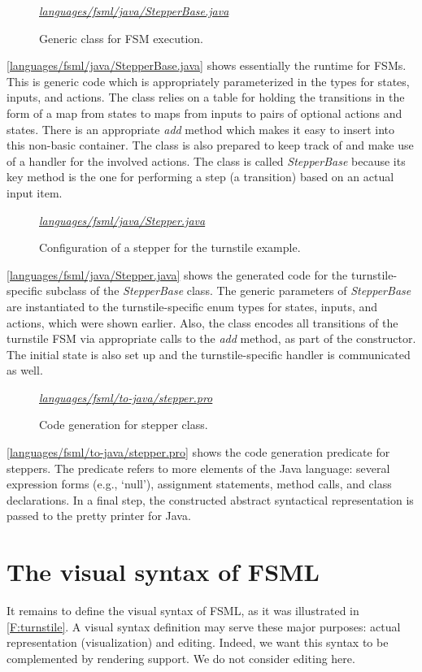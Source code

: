 \documentclass[preprint,authoryear,12pt]{noelsarticle}
\newcommand{\codefigure}[3]{
\begin{figure}[t!]
\begin{boxedminipage}{\hsize}
\mbox{}\hfill{}{\small\textit{\href{http://github.com/slebok/slepro/tree/master/#2}{#2}}}

\end{boxedminipage}
\caption{#1.}
\label{#2}
\medskip
\end{figure}}
\begin{document}
\codefigure{%
Generic class for FSM execution}{%
languages/fsml/java/StepperBase.java}{%
java}

\autoref{languages/fsml/java/StepperBase.java} shows essentially the
runtime for FSMs. This is generic code which is appropriately
parameterized in the types for states, inputs, and actions. The class
relies on a table for holding the transitions in the form of a map
from states to maps from inputs to pairs of optional actions and
states. There is an appropriate \emph{add} method which makes it easy
to insert into this non-basic container. The class is also prepared to
keep track of and make use of a handler for the involved actions. The
class is called \emph{StepperBase} because its key method is the one for
performing a step (a transition) based on an actual input item.

\codefigure{%
Configuration of a stepper for the turnstile example}{%
languages/fsml/java/Stepper.java}{%
java}

\autoref{languages/fsml/java/Stepper.java} shows the generated code
for the turnstile-specific subclass of the \emph{StepperBase}
class. The generic parameters of \emph{StepperBase} are instantiated
to the turnstile-specific enum types for states, inputs, and actions,
which were shown earlier. Also, the class encodes all transitions of
the turnstile FSM via appropriate calls to the \emph{add} method, as
part of the constructor. The initial state is also set up and the
turnstile-specific handler is communicated as well.

\codefigure{%
Code generation for stepper class}{%
languages/fsml/to-java/stepper.pro}{%
prolog}

\autoref{languages/fsml/to-java/stepper.pro} shows the code generation
predicate for steppers. The predicate refers to more elements of the
Java language: several expression forms (e.g., `null'), assignment
statements, method calls, and class declarations. In a final step, the
constructed abstract syntactical representation is passed to the
pretty printer for Java.


\section{The visual syntax of FSML}
\label{S:visual}

It remains to define the visual syntax of FSML, as it was illustrated
in \autoref{F:turnstile}. A visual syntax definition may serve these
major purposes: actual representation (visualization) and
editing. Indeed, we want this syntax to be complemented by rendering
support. We do not consider editing here.
\end{document}
